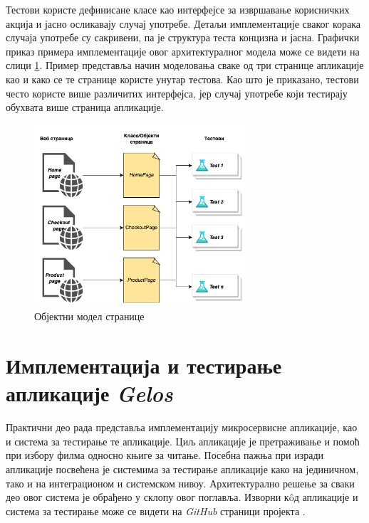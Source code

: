 \documentclass[12pt,oneside]{memoir}
\begin{document}
Тестови користе дефинисане класе као интерфејсе за извршавање корисничких акција и јасно осликавају случај употребе. Детаљи имплементације сваког корака случаја употребе су сакривени, па је структура теста концизна и јасна. Графички приказ примера имплементације овог архитектуралног модела може се видети на слици \ref{fig:pom}. Пример представља начин моделовања сваке од три странице апликације као и како се те странице користе унутар тестова. Као што је приказано, тестови често користе више различитих интерфејса, јер случај употребе који тестирају обухвата више страница апликације.
\begin{figure}[!ht]
  \centering
  \includegraphics[width=0.7\textwidth]{matfmaster/img/pom.png}
  \caption{Објектни модел странице}
  \label{fig:pom}
\end{figure}


\chapter{Имплементација и тестирање апликације \textit{Gelos}}
\label{chp:aplikacija}
Практични део рада представља имплементацију микросервисне апликације, као и система за тестирање те апликације. Циљ апликације је претраживање и помоћ при избору филма односно књиге за читање. Посебна пажња при изради апликације посвећена је системима за тестирање апликације како на јединичном, тако и на интеграционом и системском нивоу. Архитектурално решење за сваки део овог система је обрађено у склопу овог поглавља. Изворни к\^{o}д апликације и система за тестирање може се видети на \textit{GitHub} страници пројекта \cite{projekat}.
\end{document}
